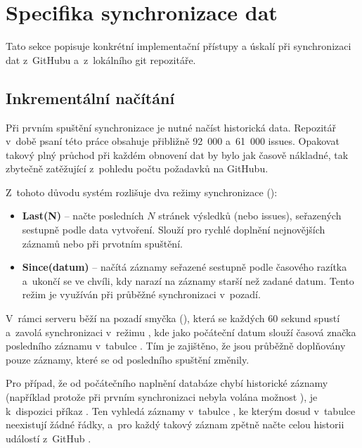 \section{Specifika synchronizace dat}
\label{sec:implementation:gotchas}

Tato sekce popisuje konkrétní implementační přístupy a úskalí při synchronizaci dat z~GitHubu a~z~lokálního git repozitáře.

\subsection{Inkrementální načítání}
\label{subsec:implementation:gotchas:incremental}

Při prvním spuštění synchronizace je nutné načíst historická data. Repozitář  v~době psaní této práce obsahuje přibližně 92~000 \PR a~61~000 issues. Opakovat takový plný průchod při každém obnovení dat by bylo jak časově nákladné, tak zbytečně zatěžující z~pohledu počtu požadavků na \API GitHubu.

Z~tohoto důvodu systém rozlišuje dva režimy synchronizace ():

\begin{itemize}
  \item \textbf{Last(N)} -- načte posledních $N$ stránek výsledků (\PR nebo issues), seřazených sestupně podle data vytvoření. Slouží pro rychlé doplnění nejnovějších záznamů nebo při prvotním spuštění.
  \item \textbf{Since(datum)} -- načítá záznamy seřazené sestupně podle časového razítka a~ukončí se ve chvíli, kdy narazí na záznamy starší než zadané datum. Tento režim je využíván při průběžné synchronizaci v~pozadí.
\end{itemize}

V~rámci serveru běží na pozadí smyčka (), která se každých 60 sekund spustí a~zavolá synchronizaci v~režimu , kde jako počáteční datum slouží časová značka posledního záznamu v~tabulce . Tím je zajištěno, že jsou průběžně doplňovány pouze záznamy, které se od posledního spuštění změnily.

Pro případ, že od počátečního naplnění databáze chybí historické záznamy (například protože při prvním synchronizaci nebyla volána možnost ), je k~dispozici příkaz . Ten vyhledá záznamy v~tabulce , ke kterým dosud v~tabulce  neexistují žádné řádky, a~pro každý takový záznam zpětně načte celou historii událostí z~GitHub \API.

